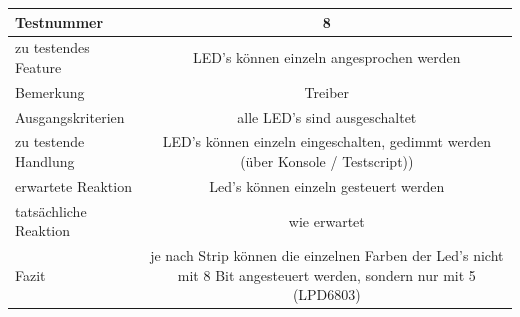 \documentclass[]{article}
\begin{document}
\begin{longtable}[]{@{}lc@{}}
\toprule
\begin{minipage}[b]{0.25\columnwidth}\raggedright\strut
Testnummer\strut
\end{minipage} & \begin{minipage}[b]{0.55\columnwidth}\centering\strut
8\strut
\end{minipage}\tabularnewline
\midrule
\endhead
\begin{minipage}[t]{0.25\columnwidth}\raggedright\strut
zu testendes Feature\strut
\end{minipage} & \begin{minipage}[t]{0.55\columnwidth}\centering\strut
LED's können einzeln angesprochen werden\strut
\end{minipage}\tabularnewline
\begin{minipage}[t]{0.25\columnwidth}\raggedright\strut
Bemerkung\strut
\end{minipage} & \begin{minipage}[t]{0.55\columnwidth}\centering\strut
Treiber\strut
\end{minipage}\tabularnewline
\begin{minipage}[t]{0.25\columnwidth}\raggedright\strut
Ausgangskriterien\strut
\end{minipage} & \begin{minipage}[t]{0.55\columnwidth}\centering\strut
alle LED's sind ausgeschaltet\strut
\end{minipage}\tabularnewline
\begin{minipage}[t]{0.25\columnwidth}\raggedright\strut
zu testende Handlung\strut
\end{minipage} & \begin{minipage}[t]{0.55\columnwidth}\centering\strut
LED's können einzeln eingeschalten, gedimmt werden (über Konsole /
Testscript))\strut
\end{minipage}\tabularnewline
\begin{minipage}[t]{0.25\columnwidth}\raggedright\strut
erwartete Reaktion\strut
\end{minipage} & \begin{minipage}[t]{0.55\columnwidth}\centering\strut
Led's können einzeln gesteuert werden\strut
\end{minipage}\tabularnewline
\begin{minipage}[t]{0.25\columnwidth}\raggedright\strut
tatsächliche Reaktion\strut
\end{minipage} & \begin{minipage}[t]{0.55\columnwidth}\centering\strut
wie erwartet\strut
\end{minipage}\tabularnewline
\begin{minipage}[t]{0.25\columnwidth}\raggedright\strut
Fazit\strut
\end{minipage} & \begin{minipage}[t]{0.55\columnwidth}\centering\strut
je nach Strip können die einzelnen Farben der Led's nicht mit 8 Bit
angesteuert werden, sondern nur mit 5 (LPD6803)\strut
\end{minipage}\tabularnewline
\bottomrule
\end{longtable}
\end{document}

